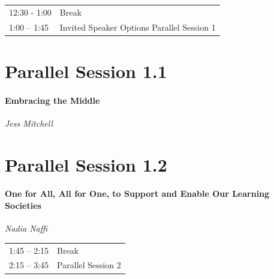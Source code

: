 \documentclass[
]{book}
\begin{document}
\begin{longtable}[]{@{}ll@{}}
\toprule
& \\
\midrule
\endhead
12:30 - 1:00 & Break \\
1:00 -- 1:45 & Invited Speaker Options Parallel Session 1 \\
\bottomrule
\end{longtable}

\hypertarget{parallel-session-1.1}{%
\section*{Parallel Session 1.1}\label{parallel-session-1.1}}

\begin{wp}
\hypertarget{embracing-the-middle}{%
\paragraph{\texorpdfstring{\textbf{Embracing the
Middle}}{Embracing the Middle}}\label{embracing-the-middle}}

\emph{Jess Mitchell}
\end{wp}

\hypertarget{parallel-session-1.2}{%
\section*{Parallel Session 1.2}\label{parallel-session-1.2}}

\begin{wp}
\hypertarget{one-for-all-all-for-one-to-support-and-enable-our-learning-societies}{%
\paragraph{\texorpdfstring{\textbf{One for All, All for One, to Support
and Enable Our Learning
Societies}}{One for All, All for One, to Support and Enable Our Learning Societies}}\label{one-for-all-all-for-one-to-support-and-enable-our-learning-societies}}

\emph{Nadia Naffi}
\end{wp}

\begin{longtable}[]{@{}ll@{}}
\toprule
& \\
\midrule
\endhead
1:45 -- 2:15 & Break \\
2:15 -- 3:45 & Parallel Session 2 \\
\bottomrule
\end{longtable}
\end{document}
